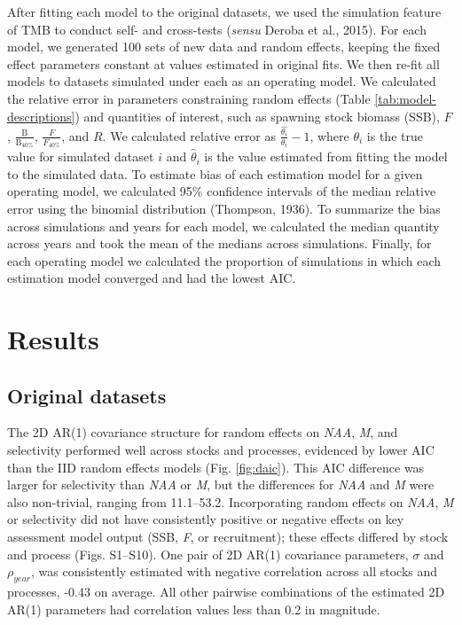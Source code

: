 \documentclass[]{article}
\begin{document}
After fitting each model to the original datasets, we used the
simulation feature of TMB to conduct self- and cross-tests (\emph{sensu}
Deroba et al., 2015). For each model, we generated 100 sets of new data
and random effects, keeping the fixed effect parameters constant at
values estimated in original fits. We then re-fit all models to datasets
simulated under each as an operating model. We calculated the relative
error in parameters constraining random effects (Table
\ref{tab:model-descriptions}) and quantities of interest, such as
spawning stock biomass (SSB), \(F\),
\(\frac{\text{B}}{\text{B}_{40\%}}\), \(\frac{F}{F_{40\%}}\), and \(R\).
We calculated relative error as \(\frac{\hat{\theta_i}}{\theta_i}-1\),
where \(\theta_i\) is the true value for simulated dataset \(i\) and
\(\hat{\theta}_i\) is the value estimated from fitting the model to the
simulated data. To estimate bias of each estimation model for a given
operating model, we calculated 95\% confidence intervals of the median
relative error using the binomial distribution (Thompson, 1936). To
summarize the bias across simulations and years for each model, we
calculated the median quantity across years and took the mean of the
medians across simulations. Finally, for each operating model we
calculated the proportion of simulations in which each estimation model
converged and had the lowest AIC.

\hypertarget{results}{%
\section{Results}\label{results}}

\hypertarget{original-datasets}{%
\subsection{Original datasets}\label{original-datasets}}

The 2D AR(1) covariance structure for random effects on \emph{NAA},
\emph{M}, and selectivity performed well across stocks and processes,
evidenced by lower AIC than the IID random effects models (Fig.
\ref{fig:daic}). This AIC difference was larger for selectivity than
\emph{NAA} or \emph{M}, but the differences for \emph{NAA} and \emph{M}
were also non-trivial, ranging from 11.1--53.2. Incorporating random
effects on \emph{NAA}, \emph{M} or selectivity did not have consistently
positive or negative effects on key assessment model output (SSB,
\emph{F}, or recruitment); these effects differed by stock and process
(Figs. S1--S10). One pair of 2D AR(1) covariance parameters, \(\sigma\)
and \(\rho_{year}\), was consistently estimated with negative
correlation across all stocks and processes, -0.43 on average. All other
pairwise combinations of the estimated 2D AR(1) parameters had
correlation values less than 0.2 in magnitude.
\end{document}
